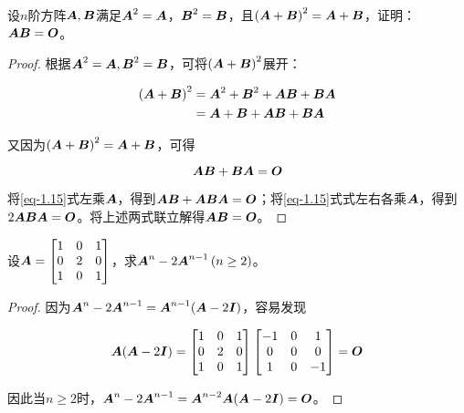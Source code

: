 \begin{problem}\label{problem-1.15}
设\(n\)阶方阵\(\mata,\matb\)满足\(\mata^2=\mata\)，\(\matb^2=\matb\)，且\(\mypar{\mata+\matb}^2=\mata+\matb\)，证明：\(\mata\matb=\mato\)。
\end{problem}
\begin{proof}
    根据\(\mata^2=\mata,\matb^2=\matb\)，可将\(\mypar{\mata+\matb}^2\)展开：

    \begin{align*}
        \mypar{\mata+\matb}^2 & =\mata^2+\matb^2+\mata\matb+\matb\mata \\
                              & =\mata+\matb+\mata\matb+\matb\mata
    \end{align*}

    又因为\(\mypar{\mata+\matb}^2=\mata+\matb\)，可得

    \begin{equation}\label{eq-1.15}
        \mata\matb+\matb\mata=\mato
    \end{equation}

    将\eqref{eq-1.15}式左乘\(\mata\)，得到\(\mata\matb+\mata\matb\mata=\mato\)；将\eqref{eq-1.15}式式左右各乘\(\mata\)，得到\(2\mata\matb\mata=\mato\)。将上述两式联立解得\(\mata\matb=\mato\)。
\end{proof}

\begin{problem}\label{problem-1.16}
设\(\mata=\begin{bmatrix}1&0&1\\0&2&0\\1&0&1\end{bmatrix}\)，求\(\mata^n-2\mata^{n-1}\mypar{n\ge2}\)。
\end{problem}
\begin{proof}
    因为\(\mata^n-2\mata^{n-1}=\mata^{n-1}(\mata-2\mati)\)，容易发现

    \begin{equation*}
        \mata(\mata-2\mati)=
        \begin{bmatrix}
            1 & 0 & 1 \\0&2&0\\1&0&1
        \end{bmatrix}
        \begin{bmatrix}
            -1 & 0 & 1 \\0&0&0\\1&0&-1
        \end{bmatrix}=\mato
    \end{equation*}

    因此当\(n\ge2\)时，\(\mata^n-2\mata^{n-1}=\mata^{n-2}\mata(\mata-2\mati)=\mato\)。
\end{proof}

